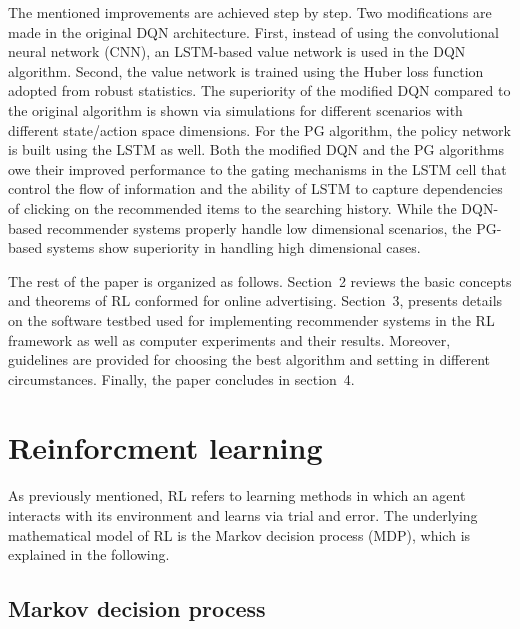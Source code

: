 \documentclass[journal]{IEEEtran}
\begin{document}
The mentioned improvements are achieved step by step. Two modifications are made in the original DQN architecture. First, instead of using the  convolutional neural network (CNN), an LSTM-based value network is used in the DQN algorithm. Second, the value network is trained using the Huber loss function adopted from robust statistics. The superiority of the modified DQN compared to the original algorithm is shown via simulations for different scenarios with different state/action space dimensions. For the PG algorithm, the policy network is built using the LSTM as well. Both the modified DQN and the PG algorithms owe their improved performance to the gating mechanisms in the LSTM cell that control the flow of information and the ability of LSTM to capture dependencies of clicking on the recommended items to the searching history.     While the DQN-based recommender systems properly handle low dimensional scenarios, the PG-based systems show superiority in handling high dimensional cases.

The rest of the paper is organized as follows. Section~2 reviews the basic concepts and theorems of RL conformed for online advertising. Section~3, presents details on the software testbed used for implementing recommender systems in the RL framework as well as computer experiments and their results. Moreover, guidelines are provided for choosing the best algorithm and setting in different circumstances. Finally, the paper concludes in section~4.


\section{Reinforcment learning}

As previously mentioned, RL refers to learning methods in which an agent interacts with its environment and learns via trial and error. The underlying mathematical model of RL is the Markov decision process (MDP), which is explained in the following.

\subsection{Markov decision process}
\end{document}
